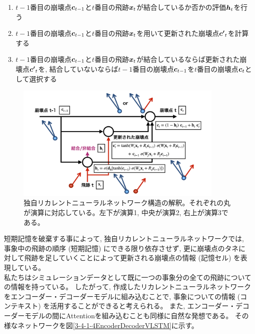 \begin{enumerate}
 \item $t-1$番目の崩壊点${\mbox{\boldmath{$c$}}}_{t-1}$と$t$番目の飛跡${\mbox{\boldmath{$x$}}}_{t}$が結合しているか否かの評価${\mbox{\boldmath{$h$}}}_{t}$を行う
 \item $t-1$番目の崩壊点${\mbox{\boldmath{$c$}}}_{t-1}$と$t$番目の飛跡${\mbox{\boldmath{$x$}}}_{t}$を用いて更新された崩壊点${\mbox{\boldmath{$c'$}}}_{t}$を計算する
 \item $t-1$番目の崩壊点${\mbox{\boldmath{$c$}}}_{t-1}$と$t$番目の飛跡${\mbox{\boldmath{$x$}}}_{t}$が結合しているならば更新された崩壊点${\mbox{\boldmath{$c'$}}}_{t}$を, 結合していないならば$t-1$番目の崩壊点${\mbox{\boldmath{$c$}}}_{t-1}$を$t$番目の崩壊点${\mbox{\boldmath{$c$}}}_{t}$として選択する
\end{enumerate}

\begin{figure}[htbp]
 \centering
 \includegraphics[width=0.9\textwidth, clip]{Figure/3Networks/3-4-1-3Interpretation.png}
 \caption[独自リカレントニューラルネットワーク構造の解釈]{独自リカレントニューラルネットワーク構造の解釈。それぞれの丸が演算に対応している。左下が演算1, 中央が演算2, 右上が演算3である。}
 \label{3-4-1-3Interpretation}
\end{figure}

短期記憶を破棄する事によって, 独自リカレントニューラルネットワークでは, 事象中の飛跡の順序 (短期記憶) にできる限り依存させず, 更に崩壊点のタネに対して飛跡を足していくことによって更新される崩壊点の情報 (記憶セル) を表現している。\\

私たちはシミュレーションデータとして既に一つの事象分の全ての飛跡についての情報を持っている。
したがって, 作成したリカレントニューラルネットワークをエンコーダー・デコーダーモデルに組み込むことで, 事象についての情報 (コンテキスト) を活用することができると考えられる。
また, エンコーダー・デコーダーモデルの間にAttentionを組み込むことも同様に自然な発想である。
その様なネットワークを図\ref{3-4-1-4EncoderDecoderVLSTM}に示す。\\

